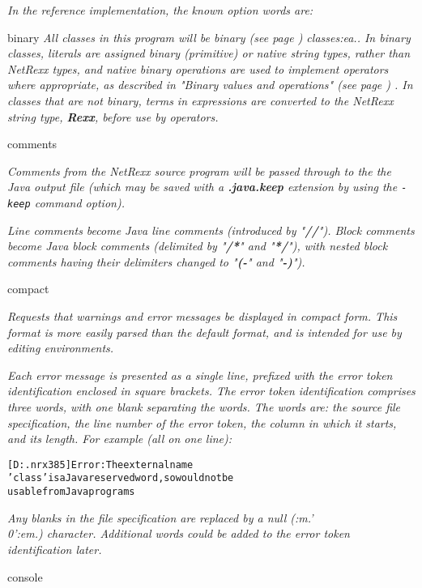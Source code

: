 \emph{In the reference implementation, the known option words are:}
\begin{description}
\item{binary}
\emph{All classes in this program will be  binary (see page \pageref{refbincla}) 
classes:ea..
In binary classes, literals are assigned binary (primitive) or native
string types, rather than NetRexx types, and native binary operations
are used to implement operators where appropriate, as described in
 "\emph{Binary values and operations}" (see page \pageref{refbinary}) .
In classes that are not binary, terms in expressions are converted to
the NetRexx string type, \textbf{Rexx}, before use by operators.}
\item{comments}

\emph{Comments from the NetRexx source program will be passed through to the
the Java output file (which may be saved with a \textbf{.java.keep}
extension by using the \texttt{-keep} command option).}
 
\emph{Line comments become Java line comments (introduced by
"\textbf{//}").
Block comments become Java block comments (delimited by
"\textbf{/*}" and "\textbf{*/}"), with nested block
comments having their delimiters changed to "\textbf{(-}" and
"\textbf{-)}").}
\item{compact}

\emph{Requests that warnings and error messages be displayed in compact
form.  This format is more easily parsed than the default format, and
is intended for use by editing environments.}
 
\emph{Each error message is presented as a single line, prefixed with the
error token identification enclosed in square brackets.
The error token identification comprises three words, with one blank
separating the words.  The words are: the source file specification, the
line number of the error token, the column in which it starts, and its
length.  For example (all on one line):}
\begin{alltt}
[D:\test\test.nrx 3 8 5] Error: The external name
'class' is a Java reserved word, so would not be
usable from Java programs
\end{alltt}
\emph{Any blanks in the file specification are replaced by a null
(:m.'\\0':em.) character.  Additional words could be added to the error
token identification later.}
\item{console}


\end{description}
